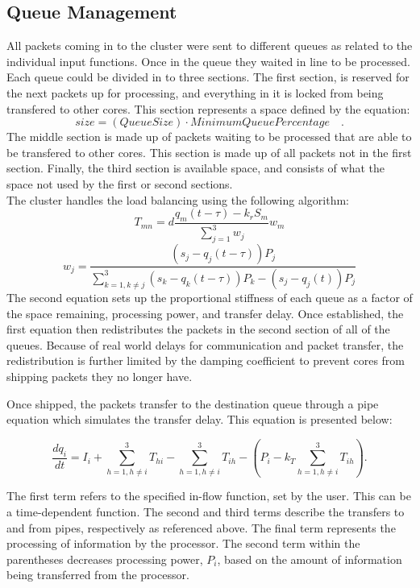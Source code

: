 \documentclass{article}
\begin{document}
\subsection{Queue Management}\label{Queue Managment}
All packets coming in to the cluster were sent to different queues as related to the individual input functions. Once in the queue they waited in line to be processed. Each queue could be divided in to three sections. The first section, is reserved for the next packets up for processing, and everything in it is locked from being transfered to other cores. This section represents a space defined by the equation:
\[size = \left(Queue Size\right) \cdot Minimum Queue Percentage \quad . \]
The middle section is made up of packets waiting to be processed that are able to be transfered to other cores. This section is made up of all packets not in the first section. Finally, the third section is available space, and consists of what the space not used by the first or second sections. 
\\ The cluster handles the load balancing using the following algorithm: 
\[T_{mn}=d\frac{q_m \left(t- \tau \right)-k_rS_m}{\sum^{3}_{j=1}w_j}w_m\]
\[w_j =\frac{\left(s_j -q_j \left(t-\tau\right)\right)P_j}{\sum^{3}_{k=1, k\neq j}\left(s_k-q_k\left(t-\tau\right)\right)P_k-\left(s_j-q_j\left(t\right)\right)P_j}\]
\noindent
The second equation sets up the proportional stiffness of each queue as a factor of the space remaining, processing power, and transfer delay.  Once established, the first equation then redistributes the packets in the second section of all of the queues. Because of real world delays for communication and packet transfer, the redistribution is further limited by the damping coefficient to prevent cores from shipping packets they no longer have. 



Once shipped, the packets transfer to the destination queue through a pipe equation which simulates the transfer delay. This equation is presented below:

\[
\frac{dq_i}{dt} = I_i + \sum_{h=1,h\ne i}^{3} T_{hi} - \sum_{h=1,h\ne i}^{3} T_{ih} - \left( P_i - k_T \sum_{h=1,h\ne i}^{3} T_{ih} \right).
\]

\noindent
The first term refers to the specified in-flow function, set by the user. This can be a time-dependent function. The second and third terms describe the transfers to and from pipes, respectively as referenced above. The final term represents the processing of information by the processor. The second term within the parentheses decreases processing power, $P_i$, based on the amount of information being transferred from the processor. 
\end{document}
